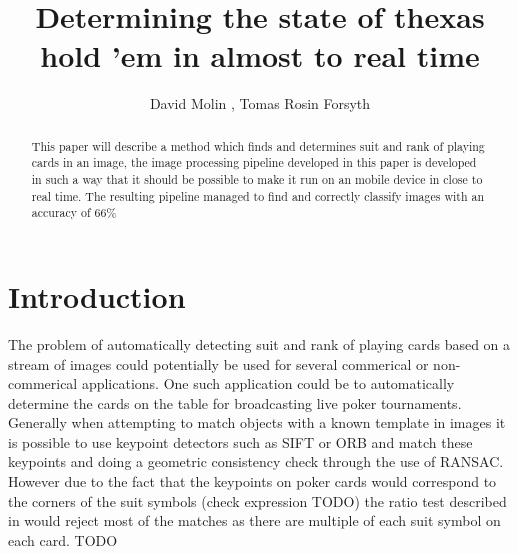 \documentclass[journal,twoside]{IEEEtran}
\begin{document}
\title{Determining the state of thexas hold 'em in almost to real time}

\author{ David Molin 
, 
Tomas Rosin Forsyth 

}%

\maketitle

\begin{abstract}
This paper will describe a method which finds and determines suit and rank of playing cards in an image, the image processing pipeline developed in this paper is developed in such a way that it should be possible to make it run on an mobile device in close to real time. The resulting pipeline managed to find and correctly classify images with an accuracy of  66\%

\end{abstract}




\IEEEpeerreviewmaketitle



\section{Introduction}
The problem of automatically detecting suit and rank of playing cards based on a stream of images could potentially be used for  several commerical or non-commerical applications. One such application could be to automatically determine the cards on the table for broadcasting live poker tournaments.
Generally when attempting to match objects with a known template in images it is possible to use keypoint detectors such as SIFT \cite{SIFT} or ORB \cite{ORB} and match these keypoints and doing a geometric consistency check through the use of RANSAC. However due to the fact that the keypoints on poker cards would correspond to the corners of the suit symbols (check expression TODO) the ratio test described in \cite{SIFT} would reject most of the matches as there are multiple of each suit symbol on each card. TODO
\end{document}
